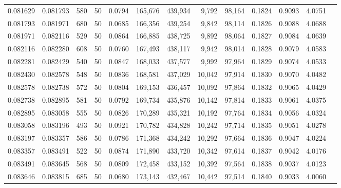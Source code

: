 \begin{tabular}{rrrrrrrrrrrrr}
0.081629 & 0.081793 &   580 &  50 &                                     0.0794 & 165,676 & 439,934 &   9,792 &  98,164 & 0.1824 & 0.9093 & 4.0751 \\
0.081793 & 0.081971 &   680 &  50 &                                     0.0685 & 166,356 & 439,254 &   9,842 &  98,114 & 0.1826 & 0.9088 & 4.0688 \\
0.081971 & 0.082116 &   529 &  50 &                                     0.0864 & 166,885 & 438,725 &   9,892 &  98,064 & 0.1827 & 0.9084 & 4.0639 \\
0.082116 & 0.082280 &   608 &  50 &                                     0.0760 & 167,493 & 438,117 &   9,942 &  98,014 & 0.1828 & 0.9079 & 4.0583 \\
0.082281 & 0.082429 &   540 &  50 &                                     0.0847 & 168,033 & 437,577 &   9,992 &  97,964 & 0.1829 & 0.9074 & 4.0533 \\
0.082430 & 0.082578 &   548 &  50 &                                     0.0836 & 168,581 & 437,029 &  10,042 &  97,914 & 0.1830 & 0.9070 & 4.0482 \\
0.082578 & 0.082738 &   572 &  50 &                                     0.0804 & 169,153 & 436,457 &  10,092 &  97,864 & 0.1832 & 0.9065 & 4.0429 \\
0.082738 & 0.082895 &   581 &  50 &                                     0.0792 & 169,734 & 435,876 &  10,142 &  97,814 & 0.1833 & 0.9061 & 4.0375 \\
0.082895 & 0.083058 &   555 &  50 &                                     0.0826 & 170,289 & 435,321 &  10,192 &  97,764 & 0.1834 & 0.9056 & 4.0324 \\
0.083058 & 0.083196 &   493 &  50 &                                     0.0921 & 170,782 & 434,828 &  10,242 &  97,714 & 0.1835 & 0.9051 & 4.0278 \\
0.083197 & 0.083357 &   586 &  50 &                                     0.0786 & 171,368 & 434,242 &  10,292 &  97,664 & 0.1836 & 0.9047 & 4.0224 \\
0.083357 & 0.083491 &   522 &  50 &                                     0.0874 & 171,890 & 433,720 &  10,342 &  97,614 & 0.1837 & 0.9042 & 4.0176 \\
0.083491 & 0.083645 &   568 &  50 &                                     0.0809 & 172,458 & 433,152 &  10,392 &  97,564 & 0.1838 & 0.9037 & 4.0123 \\
0.083646 & 0.083815 &   685 &  50 &                                     0.0680 & 173,143 & 432,467 &  10,442 &  97,514 & 0.1840 & 0.9033 & 4.0060 \\

\end{tabular}
